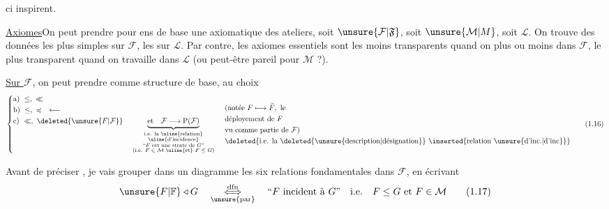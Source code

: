 %
ci inspirent.

\uline{Axiomes}\quad On peut prendre pour ens de base  une axiomatique des ateliers, soit $\unsure{\mathcal{F}|\mathfrak{F}}$, soit $\unsure{\mathcal{M}|M}$, soit $\mathcal{L}$. On trouve des données les plus simples sur $\mathcal{F}$, les   sur $\mathcal{L}$. Par contre, les axiomes essentiels sont les moins transparents quand on  plus ou moins dans $\mathcal{F}$, le plus transparent quand on travaille dans $\mathcal{L}$ (ou peut-être pareil pour $\mathcal{M}$ ?).

\uline{Sur $\mathcal{F}$}, on peut prendre comme structure de base, au choix
\[
\left\{\begin{aligned}
 &\text{a)}\ \leq,\ \ll\\
 &\text{b)}\ \leq,\ \preccurlyeq \quad \longleftarrow\\
 &\text{c)}\ \ll,\ \deleted{\unsure{F|\mathcal{F}}}\quad
 \underbrace{\text{et}\quad\mathcal{F}\longrightarrow\mathrm{P}(\mathcal{F})}_{
 \begin{smallmatrix}
 \text{i.e. la \uline{relation}}\\[-1pt]
 \text{\uline{d'incidence}}\\
 \text{``$F$ est une strate de $G$''}\\
 \text{(i.e. $F\in\mathcal{M}$ \uline{et} $F\leq G$)}
 \end{smallmatrix}}
\end{aligned}\right.
\quad
\begin{aligned}
 &\text{(notée }F\longmapsto\widetilde F,\ \text{le}\\
 &\text{déployement de }F\\
 &\text{vu comme partie de }\mathcal{F}\text{)}\\
 &\text{\deleted{i.e. la \deleted{\unsure{description|désignation}} \inserted{relation \unsure{d'inc.|d'inc}}}}
\end{aligned}
\tag*{(1.16)}
\]

 Avant de préciser , je vais grouper dans un diagramme les six relations fondamentales dans $\mathcal{F}$, en écrivant
\[
\unsure{F|\mathbb{F}}\triangleleft G\quad
\underset{\unsure{\mathrm{par}}}{\overset{\mathrm{dfn}}{\Longleftrightarrow}}\quad
\text{``$F$ incident à $G$''}\quad\text{i.e.}\quad F\leq G\ \text{et}\ F\in\mathcal{M}
\tag*{(1.17)}
\]
